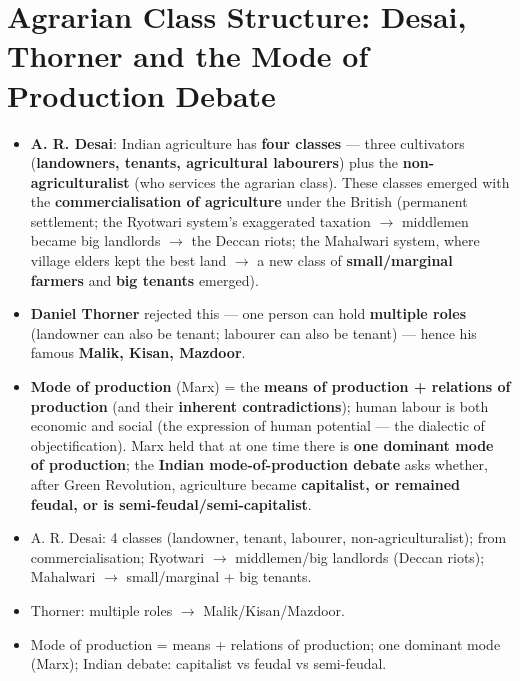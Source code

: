 \section{Agrarian Class Structure: Desai, Thorner and the Mode of Production Debate}

\begin{KeyConcept}
\begin{itemize}
\item \textbf{A. R. Desai}: Indian agriculture has \textbf{four classes} --- three cultivators (\textbf{landowners, tenants, agricultural labourers}) plus the \textbf{non-agriculturalist} (who services the agrarian class). These classes emerged with the \textbf{commercialisation of agriculture} under the British (permanent settlement; the Ryotwari system's exaggerated taxation $\rightarrow$ middlemen became big landlords $\rightarrow$ the Deccan riots; the Mahalwari system, where village elders kept the best land $\rightarrow$ a new class of \textbf{small/marginal farmers} and \textbf{big tenants} emerged).
\item \textbf{Daniel Thorner} rejected this --- one person can hold \textbf{multiple roles} (landowner can also be tenant; labourer can also be tenant) --- hence his famous \textbf{Malik, Kisan, Mazdoor}.
\item \textbf{Mode of production} (Marx) = the \textbf{means of production + relations of production} (and their \textbf{inherent contradictions}); human labour is both economic and social (the expression of human potential --- the dialectic of objectification). Marx held that at one time there is \textbf{one dominant mode of production}; the \textbf{Indian mode-of-production debate} asks whether, after Green Revolution, agriculture became \textbf{capitalist, or remained feudal, or is semi-feudal/semi-capitalist}.
\end{itemize}
\end{KeyConcept}

\begin{QuickRevision}
\begin{itemize}
\item A. R. Desai: 4 classes (landowner, tenant, labourer, non-agriculturalist); from commercialisation; Ryotwari $\rightarrow$ middlemen/big landlords (Deccan riots); Mahalwari $\rightarrow$ small/marginal + big tenants.
\item Thorner: multiple roles $\rightarrow$ Malik/Kisan/Mazdoor.
\item Mode of production = means + relations of production; one dominant mode (Marx); Indian debate: capitalist vs feudal vs semi-feudal.
\end{itemize}
\end{QuickRevision}
